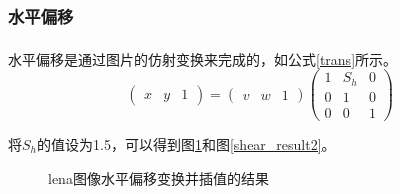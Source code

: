 \documentclass[UTF8]{ctexart}
\newcommand{\upcite}[1]{\textsuperscript{\textsuperscript{\cite{#1}}}}
\begin{document}
\subsubsection{水平偏移}

水平偏移是通过图片的仿射变换来完成的，如公式\ref{trans}所示\upcite{dip}。
\begin{equation}\label{trans}
	\left( \begin{array}{ccc}
		x & y & 1
		\end{array} \right)
		=
	\left( \begin{array}{ccc}
		v & w & 1
		\end{array} \right) 
	\left( \begin{array}{ccc}
		1  & S_{h}  & 0  \\
		0  & 1 & 0 \\
		0 & 0 & 1 
		\end{array} \right)
\end{equation}

将$S_{h}$的值设为1.5，可以得到图\ref{shear_result1}和图\ref{shear_result2}。
\begin{figure}[h!]
	\centering
	\hspace{0.1in} 
	\hspace{0.1in} 
	\caption{lena图像水平偏移变换并插值的结果} 
	\label{shear_result1} %
\end{figure}
\end{document}
